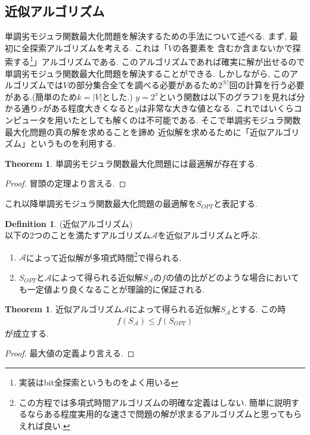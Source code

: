 \documentclass[11pt, a4paper, dvipdfmx]{jsarticle}
\theoremstyle{definition}
\newtheorem{Definition+}[Axiom+]{Definition}
\newtheorem{Theorem+}[Axiom+]{Theorem}
\begin{document}
 \subsection{近似アルゴリズム}
単調劣モジュラ関数最大化問題を解決するための手法について述べる. 
まず, 最初に全探索アルゴリズムを考える. これは「$V$の各要素を
含むか含まないかで探索する\footnote{実装はbit全探索というものをよく用いる}」アルゴリズムである. 
このアルゴリズムであれば確実に解が出せるので単調劣モジュラ関数最大化問題を解決することができる. 
しかしながら, このアルゴリズムでは$V$の部分集合全てを調べる必要があるため$2^{|V|}$回の計算を行う必要がある.(簡単のため$k = |V|$とした.)
$y = 2^x$という関数は以下のグラフ1を見れば分かる通り$x$がある程度大きくなると$y$は非常な大きな値となる. 
これではいくらコンピュータを用いたとしても解くのは不可能である. そこで単調劣モジュラ関数最大化問題の真の解を求めることを諦め
近似解を求めるために「近似アルゴリズム」というものを利用する. 
\begin{Theorem+}
    単調劣モジュラ関数最大化問題には最適解が存在する.
\begin{proof}
    冒頭の定理より言える.
\end{proof}
これ以降単調劣モジュラ関数最大化問題の最適解を$S_{OPT}$と表記する.
\end{Theorem+}
\begin{Definition+}(近似アルゴリズム)\\
    以下の2つのことを満たすアルゴリズム$\mathcal{A}$を近似アルゴリズムと呼ぶ.
    \begin{enumerate}
        \item $\mathcal{A}$によって近似解が多項式時間\footnote{この方程では多項式時間アルゴリズムの明確な定義はしない. 簡単に説明するならある程度実用的な速さで問題の解が求まるアルゴリズムと思ってもらえれば良い. }で得られる.
        \item $S_{OPT}$と$\mathcal{A}$によって得られる近似解$S_{\mathcal{A}}$の$f$の値の比がどのような場合においても一定値より良くなることが理論的に保証される.
    \end{enumerate}
\end{Definition+}
\begin{Theorem+}
    近似アルゴリズム$\mathcal{A}$によって得られる近似解$S_{\mathcal{A}}$とする. この時
    \begin{align*}
        f(S_{\mathcal{A}})\leq f(S_{OPT})
    \end{align*}
    が成立する.
    \begin{proof}
        最大値の定義より言える.
    \end{proof}
\end{Theorem+}
\end{document}

